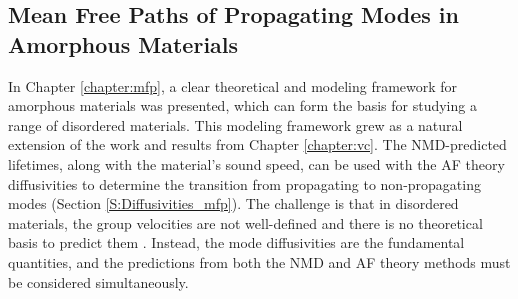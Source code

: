 \subsection{\label{Overview:MFP}
Mean Free Paths of Propagating Modes in Amorphous Materials}

In Chapter \ref{chapter:mfp}, a clear theoretical and modeling framework 
for amorphous materials was 
presented, which can form the basis for studying a range of disordered 
materials. 
This modeling framework grew as a natural extension of the work and results 
from Chapter \ref{chapter:vc}. 
The NMD-predicted lifetimes, along with the material's sound speed, 
can be used with the AF theory diffusivities to determine the transition 
from propagating to non-propagating modes 
(Section \ref{S:Diffusivities_mfp}). The challenge is that in 
disordered materials, the group velocities 
are not well-defined and there is no theoretical basis to predict 
them \cite{duda_reducing_2011,donadio_atomistic_2009,
he_heat_2011,he_thermal_2011,he_morphology_2011,hori_phonon_2013}. 
Instead, the mode diffusivities are the fundamental quantities, and 
the predictions from both the NMD and AF theory methods must be considered 
simultaneously. 


